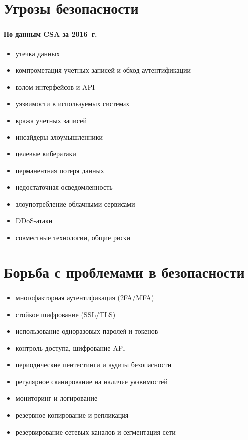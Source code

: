 
\frame[plain]{\titlepage} %


\section{Угрозы безопасности}

\begin{frame}
\frametitle{\insertsection}
\framesubtitle{По данным CSA за 2016~г.}

\begin{itemize}
    \item утечка данных
    \item компрометация учетных записей и обход аутентификации
    \item взлом интерфейсов и API
    \item уязвимости в используемых системах
    \item кража учетных записей
    \item инсайдеры-злоумышленники
    \item целевые кибератаки
    \item перманентная потеря данных
    \item недостаточная осведомленность
    \item злоупотребление облачными сервисами
    \item DDoS-атаки
    \item совместные технологии, общие риски
\end{itemize}
\end{frame}


\section{Борьба с проблемами в безопасности}

\begin{frame}
\frametitle{\insertsection}

\begin{itemize}
    \item многофакторная аутентификация (2FA/MFA)
    \item стойкое шифрование (SSL/TLS)
    \item использование одноразовых паролей и токенов
    \item контроль доступа, шифрование API
    \item периодические пентестинги и аудиты безопасности
    \item регулярное сканирование на наличие уязвимостей
    \item мониторинг и логирование
    \item резервное копирование и репликация
    \item резервирование сетевых каналов и сегментация сети
\end{itemize}
\end{frame}

